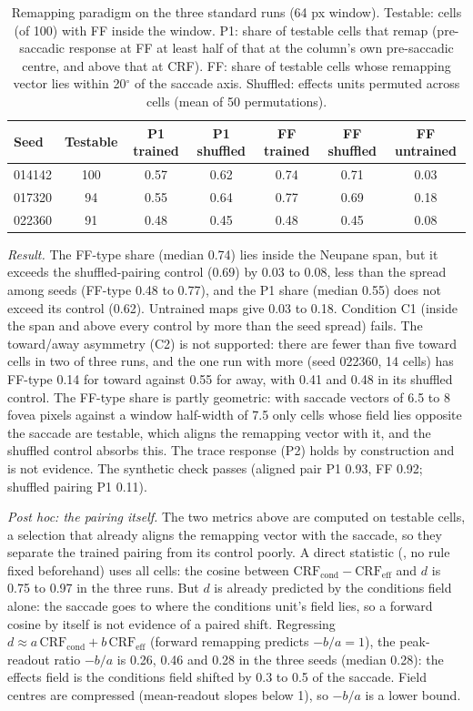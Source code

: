 \documentclass[11pt,a4paper]{article}
\newcommand{\code}[1]{\path{#1}}
\begin{document}
\begin{table}[h]
\centering\footnotesize
\setlength{\tabcolsep}{4pt}
\begin{tabular}{@{}lcccccc@{}}
\toprule
Seed & Testable & P1 trained & P1 shuffled & FF trained & FF shuffled & FF untrained \\
\midrule
014142 & 100 & 0.57 & 0.62 & 0.74 & 0.71 & 0.03 \\
017320 & 94 & 0.55 & 0.64 & 0.77 & 0.69 & 0.18 \\
022360 & 91 & 0.48 & 0.45 & 0.48 & 0.45 & 0.08 \\
\bottomrule
\end{tabular}
\caption{Remapping paradigm on the three standard runs (64 px window). Testable: cells (of 100) with FF
inside the window. P1: share of testable cells that remap (pre-saccadic response at FF at
least half of that at the column's own pre-saccadic centre, and above that at CRF). FF:
share of testable cells whose remapping vector lies within 20$^\circ$ of the saccade
axis. Shuffled: effects units permuted across cells (mean of 50 permutations).}
\label{tab:remap}
\end{table}

\emph{Result.} The FF-type share (median 0.74) lies inside the
Neupane span, but it exceeds the shuffled-pairing control (0.69) by 0.03 to 0.08, less than the spread
among seeds (FF-type 0.48 to 0.77), and the P1 share (median 0.55) does not exceed its control (0.62).
Untrained maps give 0.03 to 0.18. Condition C1 (inside the span and above every
control by more than the seed spread) fails. The toward/away asymmetry (C2) is not
supported: there are fewer than five toward cells in two of three runs, and the one run with
more (seed 022360, 14 cells) has FF-type 0.14 for toward against 0.55 for away,
with 0.41 and 0.48 in its shuffled control. The FF-type share is partly
geometric: with saccade vectors of 6.5 to 8 fovea pixels against a window half-width of 7.5
only cells whose field lies opposite the saccade are testable, which aligns the remapping
vector with it, and the shuffled control absorbs this. The trace response (P2) holds by
construction and is not evidence. The synthetic check passes (aligned pair P1 0.93, FF
0.92; shuffled pairing P1 0.11).

\emph{Post hoc: the pairing itself.} The two metrics above are computed on testable
cells, a selection that already aligns the remapping vector with the saccade, so they separate
the trained pairing from its control poorly. A direct statistic
(\code{scripts/exp_pairing_regression.py}, no rule fixed beforehand) uses all cells: the cosine
between $\mathrm{CRF}_{\mathrm{cond}}-\mathrm{CRF}_{\mathrm{eff}}$ and $d$ is 0.75 to 0.97
in the three runs. But $d$ is already predicted
by the conditions field alone: the saccade goes to where the conditions unit's field lies, so
a forward cosine by itself is not evidence of a paired shift. Regressing
$d\approx a\,\mathrm{CRF}_{\mathrm{cond}}+b\,\mathrm{CRF}_{\mathrm{eff}}$ (forward remapping predicts
$-b/a=1$), the peak-readout ratio $-b/a$ is 0.26, 0.46 and 0.28 in the three seeds
(median 0.28): the effects field is the conditions field shifted by
0.3 to 0.5 of the saccade. Field centres are compressed (mean-readout slopes below 1), so $-b/a$
is a lower bound.
\end{document}
